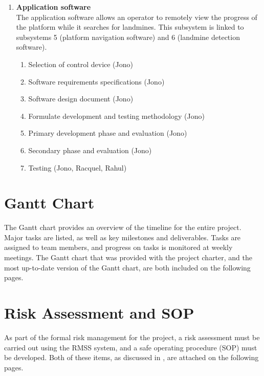 \documentclass[main.tex]{subfiles}
\begin{document}
\begin{appendices}
{\begin{enumerate}
\item \textbf{Application software}\\
The application software allows an operator to remotely view the progress of the platform while it searches for landmines. This subsystem is linked to subsystems 5 (platform navigation software) and 6 (landmine detection software).
    \begin{enumerate}[label*=\arabic*.]
    \item Selection of control device (Jono)
    \item Software requirements specifications (Jono)
    \item Software design document (Jono)
    \item Formulate development and testing methodology (Jono)
    \item Primary development phase and evaluation (Jono)
    \item Secondary phase and evaluation (Jono)
    \item Testing (Jono, Racquel, Rahul)
    \end{enumerate}
\end{enumerate}}

\chapter{Gantt Chart}
The Gantt chart provides an overview of the timeline for the entire project. Major tasks are listed, as well as key milestones and deliverables. Tasks are assigned to team members, and progress on tasks is monitored at weekly meetings. The Gantt chart that was provided with the project charter, and the most up-to-date version of the Gantt chart, are both included on the following pages.



\chapter{Risk Assessment and SOP}
As part of the formal risk management for the project, a risk assessment must be carried out using the RMSS system, and a safe operating  procedure (SOP) must be developed. Both of these items, as discussed in , are attached on the following pages.





\end{appendices}
\end{document}
